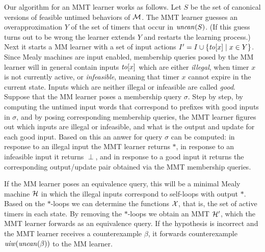 Our algorithm for an MMT learner works as follows.
Let $S$ be the set of canonical versions of feasible untimed behaviors of ${\cal M}$.
The MMT learner guesses an overapproximation $Y$ of the set of timers that occur in $\mathit{uncan}({S})$.
(If this guess turns out to be wrong the learner extends $Y$ and restarts the learning process.)
Next it starts a MM learner with a set of input actions $I' = I \cup \{ \mathit{to}[x] \mid x \in Y \}$.
Since Mealy machines are input enabled, membership queries posed by the MM learner will in general contain
inputs $\mathit{to}[x]$ which are either \emph{illegal}, when timer $x$ is not currently active, or \emph{infeasible},
meaning that timer $x$ cannot expire in the current state.
Inputs which are neither illegal or infeasible are called \emph{good}.
Suppose that the MM learner poses a membership query $\sigma$.
Step by step, by computing the untimed input words that correspond to prefixes with good inputs in $\sigma$, 
and by posing corresponding membership queries,
the MMT learner figures out which inputs are illegal or infeasible, and what is the output and update for each good input.
Based on this an anwer for query $\sigma$ can be computed:
in response to an illegal input the MMT learner returns $\ast$, 
in response to an infeasible input it returns $\perp$,
and in response to a good input it returns the corresponding output/update pair obtained via the MMT membership queries.

If the MM learner poses an equivalence query, this will be a minimal Mealy machine ${\cal H}$ in which the illegal
inputs correspond to self-loops with output $\ast$. Based on the $\ast$-loops we can
determine the functions $\mathcal{X}$, that is, the set of active timers in each state. By removing the $\ast$-loops we
obtain an MMT ${\cal H}'$, which the MMT learner forwards as an equivalence query.
If the hypothesis is incorrect and the MMT learner receives a counterexample $\beta$,
it forwards counterexample $\mathit{uiw}(\mathit{uncan}({\beta}))$ to the MM learner.

